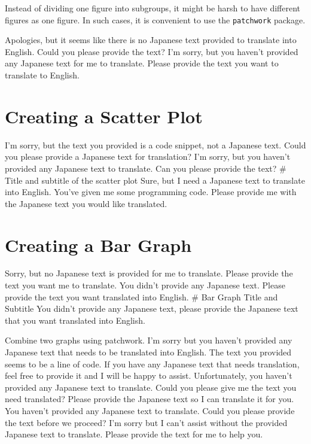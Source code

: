 \documentclass[
  a4paper,
]{book}
\begin{document}
Instead of dividing one figure into subgroups, it might be harsh to have
different figures as one figure. In such cases, it is convenient to use
the \texttt{patchwork} package.

Apologies, but it seems like there is no Japanese text provided to
translate into English. Could you please provide the text? I'm sorry,
but you haven't provided any Japanese text for me to translate. Please
provide the text you want to translate to English.


\chapter{Creating a Scatter Plot}\label{creating-a-scatter-plot}

I'm sorry, but the text you provided is a code snippet, not a Japanese
text. Could you please provide a Japanese text for translation? I'm
sorry, but you haven't provided any Japanese text to translate. Can you
please provide the text? \# Title and subtitle of the scatter plot Sure,
but I need a Japanese text to translate into English. You've given me
some programming code. Please provide me with the Japanese text you
would like translated.


\chapter{Creating a Bar Graph}\label{creating-a-bar-graph}

Sorry, but no Japanese text is provided for me to translate. Please
provide the text you want me to translate. You didn't provide any
Japanese text. Please provide the text you want translated into English.
\# Bar Graph Title and Subtitle You didn't provide any Japanese text,
please provide the Japanese text that you want translated into English.

Combine two graphs using patchwork. I'm sorry but you haven't provided
any Japanese text that needs to be translated into English. The text you
provided seems to be a line of code. If you have any Japanese text that
needs translation, feel free to provide it and I will be happy to
assist. Unfortunately, you haven't provided any Japanese text to
translate. Could you please give me the text you need translated? Please
provide the Japanese text so I can translate it for you. You haven't
provided any Japanese text to translate. Could you please provide the
text before we proceed? I'm sorry but I can't assist without the
provided Japanese text to translate. Please provide the text for me to
help you.
\end{document}
